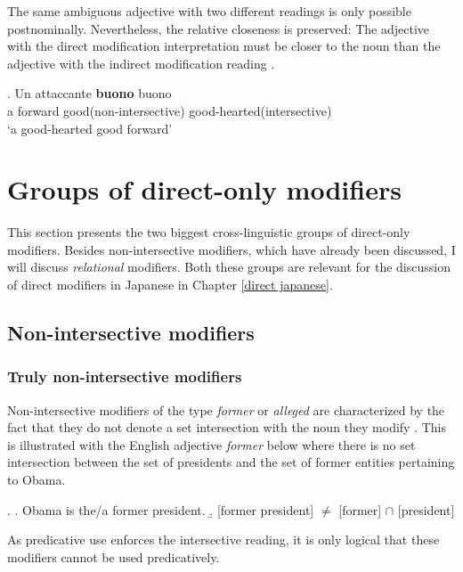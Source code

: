 The same ambiguous adjective with two different readings is only possible postnominally. Nevertheless, the relative closeness is preserved: The adjective with the direct modification interpretation must be closer to the noun than the adjective with the indirect modification reading \citep[20–22]{cinque:2010:adj}. 

\exg. Un attaccante \textbf{buono} buono \\
a forward good(non-intersective) good-hearted(intersective)\\
`a good-hearted good forward' \null\hfill \citep[21]{cinque:2010:adj}

\section{Groups of direct-only modifiers} \label{directmodifiers}

This section presents the two biggest cross-linguistic groups of direct-only modifiers. Besides non-intersective modifiers, which have already been discussed, I will discuss \textit{relational} modifiers. Both these groups are relevant for the discussion of direct modifiers in Japanese in Chapter \ref{direct japanese}.

\subsection{Non-intersective modifiers} \label{intersective}

\subsubsection{Truly non-intersective modifiers}

Non-intersective modifiers of the type \textit{former} or \textit{alleged} are characterized by the fact that they do not denote a set intersection with the noun they modify \citep{vendler:1957:verbs, siegel:1976:capturing, bolinger:1967:adj, kamp:1995:prototype, larson:1998:events}. This is illustrated with the English adjective \textit{former} below where there is no set intersection between the set of presidents and the set of former entities pertaining to Obama.

\ex. \a. Obama is the/a former president.
\b. [former president] $\neq$ [former] $\cap$ [president]

As predicative use enforces the intersective reading, it is only logical that these modifiers cannot be used predicatively.

